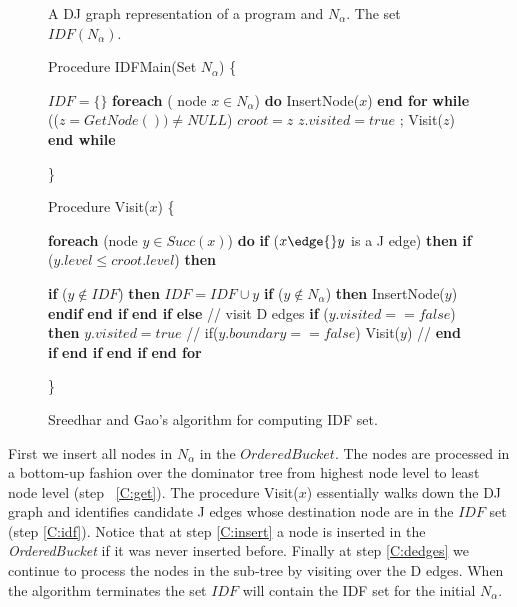 \begin{figure}[!ht]
\centering
\begin{minipage}[t]{5in}
 A DJ graph representation of a program and $N_{\alpha}$.
 The set $IDF(N_{\alpha})$.

Procedure IDFMain(Set $N_{\alpha}$) 
\{
\begin{code}
 $IDF = \{ \}$
 {\bf foreach} ( node $x \in  N_{\alpha}$) {\bf do}
    InsertNode($x$)
 {\bf end for}
 {\bf while} (($z = GetNode()) \neq NULL$)  \label{C:get}
   $croot = z$
   $z.visited = true$ ;
   Visit($z$)
 {\bf end while}
\end{code}
\} 

Procedure Visit($x$)
\{
\begin{code}
 {\bf foreach} (node $y \in  Succ(x)$) {\bf do}
  {\bf if} ($x \edge{} y$ is a  J edge) {\bf then}
   {\bf if} ($y.level \leq croot.level$) {\bf then}

     {\bf if} ($y \not \in IDF$) {\bf then}
        $IDF = IDF \cup {y}$   \label{C:idf}
        {\bf if} ($y \not  \in N_{\alpha}$) {\bf then}
          InsertNode($y$) \label{C:insert}
        {\bf endif}
     {\bf end if}
  {\bf end if}
 {\bf else} // visit D edges 
   {\bf if} ($y.visited == false $) {\bf then}
    $y.visited = true$
    // if($y.boundary == false$)   \label{C:cached}
     Visit($y$) \label{C:dedges}
 // {\bf end if}
   {\bf end if}
  {\bf end if}
 {\bf end for}
\end{code}
\} 
\end{minipage}
\caption{Sreedhar and Gao's algorithm for computing IDF set.}
\label{F:IDFMain}
\end{figure}

First we insert all nodes in $N_{\alpha}$ in the $OrderedBucket$. The nodes are processed
in a bottom-up fashion over the dominator tree from highest node level to least node level
(step ~\ref{C:get}). The procedure Visit($x$) essentially walks down the  DJ graph 
and identifies candidate J edges whose destination node are in the $IDF$ set (step \ref{C:idf}).
Notice that at step \ref{C:insert} a node is inserted in the {\it OrderedBucket} if it was
never inserted before. Finally at step \ref{C:dedges} we continue to process the nodes
in the sub-tree by visiting over the D edges. When the algorithm terminates the 
set $IDF$ will contain the IDF set for the initial $N_{\alpha}$.

